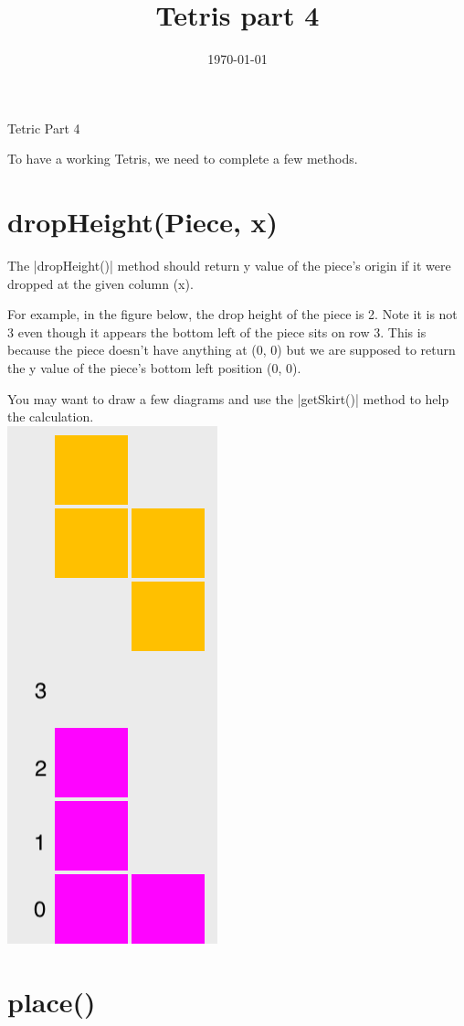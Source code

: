 \documentclass[letterpaper,12pt]{article}
\date{\today}
\title{Tetris part 4}
\renewcommand{\verb}{\collectverb{\color{codegreen}}}
\begin{document}
\begin{center}
    \Large{Tetric Part 4}
\end{center}
To have a working Tetris, we need to complete a few methods.

\section{dropHeight(Piece, x)}
The \verb|dropHeight()| method should return y value of the piece's origin if it were dropped at the given column (x).

For example, in the figure below, the drop height of the piece is 2. Note it is not 3
even though it appears the bottom left of the piece sits on row 3. This is because the piece doesn't have anything at (0, 0)
but we are supposed to return the y value of the piece's bottom left position (0, 0).

You may want to draw a few diagrams and use the \verb|getSkirt()| method to help the calculation.
\\\includegraphics[scale=0.7]{drop.png}

\section{place()}
\end{document}
